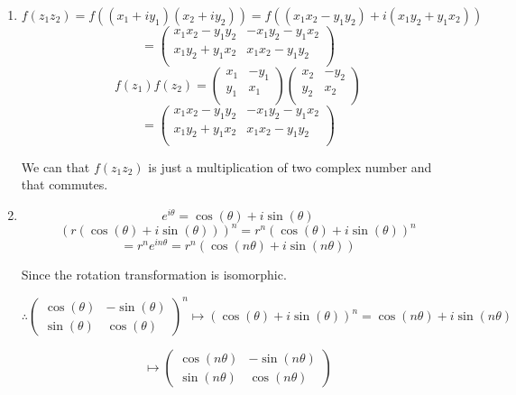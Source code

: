 \documentclass[12pt]{article}
\begin{document}
\begin{enumerate}
    \item
          \[
              f\left(z_{1} z_{2}\right) = f((x_1 + iy_1)(x_2 + iy_2)) = f((x_1x_2 - y_1y_2) + i(x_1y_2 + y_1x_2))
          \]
          \[
              =\begin{pmatrix}
                  x_1x_2 - y_1y_2 & -x_1y_2 - y_1x_2 \\
                  x_1y_2 + y_1x_2 & x_1x_2 - y_1y_2  \\
              \end{pmatrix}
          \]
          \[
              f\left(z_{1}\right) f\left(z_{2}\right) = \begin{pmatrix}
                  x_1 & -y_1 \\
                  y_1 & x_1  \\
              \end{pmatrix}\begin{pmatrix}
                  x_2 & -y_2 \\
                  y_2 & x_2  \\
              \end{pmatrix}
          \]
          \[
              = \begin{pmatrix}
                  x_1x_2 - y_1y_2 & -x_1y_2 - y_1x_2 \\
                  x_1y_2 + y_1x_2 & x_1x_2 - y_1y_2  \\
              \end{pmatrix}
          \]

          We can that \(f\left(z_{1} z_{2}\right)\) is just a multiplication of two complex number and that commutes.
    \item \[
              e^{i\theta} = \cos(\theta) + i\sin(\theta)
          \]
          \begin{equation}
              {(r(\cos (\theta)+i \sin (\theta)))}^{n}=r^{n}{(\cos (\theta) + i \sin (\theta))}^n
          \end{equation}
          \[
              =r^{n}e^{in\theta} =  r^{n}(\cos(n\theta) + i\sin(n\theta))
          \]

          Since the rotation transformation is isomorphic.

          \[
              \therefore \left(\begin{array}{cc}
                  \cos (\theta) & -\sin (\theta) \\
                  \sin (\theta) & \cos (\theta)
              \end{array}\right)^{n} \mapsto {(\cos(\theta) + i\sin(\theta))}^n = \cos(n\theta) + i\sin(n\theta)
          \]

          \[
              \mapsto \left(\begin{array}{cc}
                      \cos (n \theta) & -\sin (n \theta) \\
                      \sin (n \theta) & \cos (n \theta)
                  \end{array}\right)
          \]

\end{enumerate}

\newpage



\nocite{El-Deeb_PEU-323_Assignments}
\end{document}
